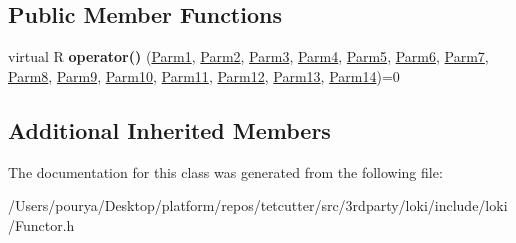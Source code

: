 \subsection*{Public Member Functions}
\begin{DoxyCompactItemize}
\item 
\hypertarget{classLoki_1_1FunctorImpl_3_01R_00_01_01_01_01_01_01_01_01_01_01_01_01_01_01_01_01_01_01_01_01_01d61e3ebe027f187786ba8179102cc4e2_a6523937144a6d2cc6ab5070a33ffe888}{}virtual R {\bfseries operator()} (\hyperlink{classLoki_1_1EmptyType}{Parm1}, \hyperlink{classLoki_1_1EmptyType}{Parm2}, \hyperlink{classLoki_1_1EmptyType}{Parm3}, \hyperlink{classLoki_1_1EmptyType}{Parm4}, \hyperlink{classLoki_1_1EmptyType}{Parm5}, \hyperlink{classLoki_1_1EmptyType}{Parm6}, \hyperlink{classLoki_1_1EmptyType}{Parm7}, \hyperlink{classLoki_1_1EmptyType}{Parm8}, \hyperlink{classLoki_1_1EmptyType}{Parm9}, \hyperlink{classLoki_1_1EmptyType}{Parm10}, \hyperlink{classLoki_1_1EmptyType}{Parm11}, \hyperlink{classLoki_1_1EmptyType}{Parm12}, \hyperlink{classLoki_1_1EmptyType}{Parm13}, \hyperlink{classLoki_1_1EmptyType}{Parm14})=0\label{classLoki_1_1FunctorImpl_3_01R_00_01_01_01_01_01_01_01_01_01_01_01_01_01_01_01_01_01_01_01_01_01d61e3ebe027f187786ba8179102cc4e2_a6523937144a6d2cc6ab5070a33ffe888}

\end{DoxyCompactItemize}
\subsection*{Additional Inherited Members}


The documentation for this class was generated from the following file\+:\begin{DoxyCompactItemize}
\item 
/\+Users/pourya/\+Desktop/platform/repos/tetcutter/src/3rdparty/loki/include/loki/Functor.\+h\end{DoxyCompactItemize}
